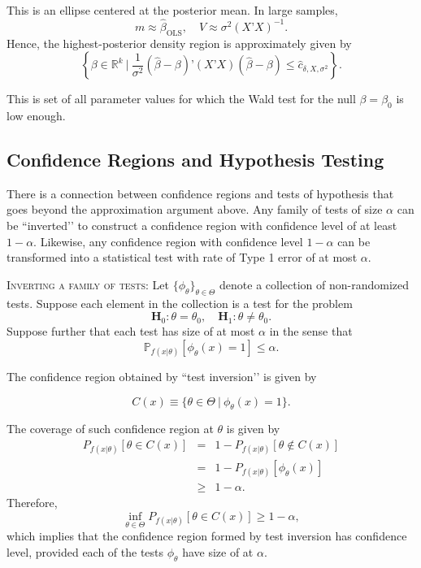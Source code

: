 \documentclass[11pt]{article} %
\begin{document}
\noindent This is an ellipse centered at the posterior mean. In large samples, 
$$ m \approx \widehat{\beta}_{\textrm{OLS}}, \quad V \approx \sigma^2 (X’X)^{-1}.$$
Hence, the highest-posterior density region is approximately given by 
\[ \left \{ \beta \in \mathbb{R}^{k} \: \Big | \:  \frac{1}{\sigma^2}(\widehat{\beta} - \beta) ’(X’X)  (\widehat{\beta} - \beta)  \leq \widehat{c}_{\delta,X,\sigma^2} \right \}. \]

\noindent This is set of all parameter values for which the Wald test for the null $\beta = \beta_0$ is low enough. 

\subsection{Confidence Regions and Hypothesis Testing}
There is a connection between confidence regions and tests of hypothesis that goes beyond the approximation argument above. Any family of tests of size $\alpha$ can be ``inverted’’ to construct a confidence region with confidence level of at least $1-\alpha$. Likewise, any confidence region with confidence level $1-\alpha$ can be transformed into a statistical test with rate of Type 1 error of at most $\alpha$. 

{\scshape Inverting a family of tests:} Let $\{\phi_{\theta}\}_{\theta \in \Theta}$ denote a collection of non-randomized tests. Suppose each element in the collection is a test for the problem
\[ \mathbf{H}_0: \theta =\theta_0, \quad \mathbf{H}_1: \theta \neq \theta_0. \]
Suppose further that each test has size of at most $\alpha$ in the sense that
\[ \mathbb{P}_{f(x|\theta)} [\phi_{\theta}(x)=1] \leq \alpha. \]

\noindent The confidence region obtained by ``test inversion’’ is given by

\[ C  (x) \equiv \{ \theta \in \Theta \: | \: \phi_{\theta}(x)=1\}. \]

\noindent The coverage of such confidence region at $\theta$ is given by
\begin{eqnarray*}
P_{f(x|\theta)} [\theta \in C(x)] &=& 1-P_{f(x|\theta)} [\theta \notin C(x)]  \\
&=& 1- P_{f(x|\theta)} [ \phi_{\theta}(x) ] \\
& \geq & 1-\alpha.   
\end{eqnarray*}
\noindent Therefore, 
\[\inf_{\theta \in \Theta} P_{f(x|\theta)} [\theta \in C(x)] \geq 1-\alpha,   \]
\noindent which implies that the confidence region formed by test inversion has confidence level, provided each of the tests $\phi_{\theta}$ have size of at $\alpha$. \\
\end{document}
